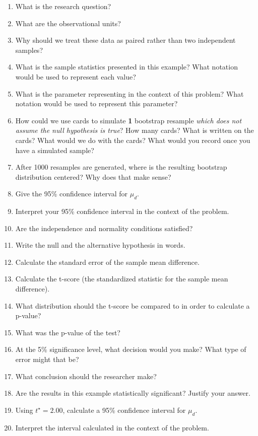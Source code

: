\documentclass[
]{report}
\newcommand{\rgs}{\vspace{12pt}} %
\begin{document}
\begin{enumerate}
\def\labelenumi{\arabic{enumi}.}
\item
  What is the research question?
  \rgs
\item
  What are the observational units?
  \rgs
\item
  Why should we treat these data as paired rather than two independent samples?
  \rgs
\item
  What is the sample statistics presented in this example? What notation would be used to represent each value?
  \rgs
\item
  What is the parameter representing in the context of this problem? What notation would be used to represent this parameter?
  \rgs
  \rgs
\item
  How could we use cards to simulate \textbf{1} bootstrap resample \emph{which does not assume the null hypothesis is true}? How many cards? What is written on the cards? What would we do with the cards? What would you record once you have a simulated sample?
  \rgs
  \rgs
\item
  After 1000 resamples are generated, where is the resulting bootstrap distribution centered? Why does that make sense?
  \rgs
  \rgs
\item
  Give the 95\% confidence interval for \(\mu_d\).
  \rgs
\item
  Interpret your 95\% confidence interval in the context of the problem.
  \rgs
  \rgs
\item
  Are the independence and normality conditions satisfied?
  \rgs
  \rgs
\item
  Write the null and the alternative hypothesis in words.
  \rgs
  \rgs
\item
  Calculate the standard error of the sample mean difference.
  \rgs
\item
  Calculate the t-score (the standardized statistic for the sample mean difference).
  \rgs
\item
  What distribution should the t-score be compared to in order to calculate a p-value?
  \rgs
\item
  What was the p-value of the test?
  \rgs
\item
  At the 5\% significance level, what decision would you make? What type of error might that be?
  \rgs
\item
  What conclusion should the researcher make?
  \rgs
\item
  Are the results in this example statistically significant? Justify your answer.
  \rgs
\item
  Using \(t^\star=2.00\), calculate a 95\% confidence interval for \(\mu_d\).
  \rgs
\item
  Interpret the interval calculated in the context of the problem.
  \rgs
  \rgs
\end{enumerate}
\end{document}

